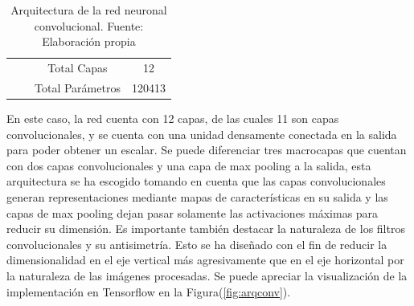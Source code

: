 \begin{table}[!h]
{\begin{tabular}{@{}cccccc@{}}
                                                    & \multicolumn{1}{c|}{}              & \multicolumn{2}{c|}{Total Capas}                                                                                                                                                            & \multicolumn{2}{c|}{12}                                                                                                                                                                          \\ \cmidrule(l){3-6} 
                                                    & \multicolumn{1}{c|}{}              & \multicolumn{2}{c|}{Total Parámetros}                                                                                                                                                       & \multicolumn{2}{c|}{120413}                                                                                                                                                                      \\ \cmidrule(l){3-6} 
            \end{tabular}%
            }
            \caption{Arquitectura de la red neuronal convolucional. Fuente: Elaboración propia}
            \label{tbl:arqconv}
        \end{table}

        En este caso, la red cuenta con 12 capas, de las cuales 11 son capas convolucionales, y se cuenta con una unidad densamente
        conectada en la salida para poder obtener un escalar. Se puede diferenciar tres macrocapas que cuentan con dos capas 
        convolucionales y una capa de max pooling a la salida, esta arquitectura se ha escogido tomando en cuenta que 
        las capas convolucionales generan representaciones mediante mapas de características en su salida y las capas de max pooling 
        dejan pasar solamente las activaciones máximas para reducir su dimensión. Es importante también destacar la naturaleza 
        de los filtros convolucionales y su antisimetría. Esto se ha diseñado con el fin de reducir la dimensionalidad en el 
        eje vertical más agresivamente que en el eje horizontal por la naturaleza de las imágenes procesadas. Se puede apreciar 
        la visualización de la implementación en Tensorflow en la Figura(\ref{fig:arqconv}).

